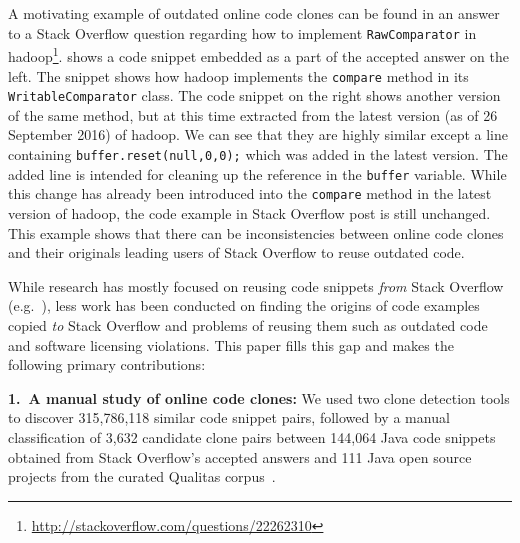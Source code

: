 \documentclass[sigconf,review, anonymous]{acmart}
\begin{document}
A motivating example of outdated online code clones can be found in an
answer to a Stack Overflow question regarding how to implement
{\small{\texttt{RawComparator}}} in
\textsf{hadoop}\footnote{\url{http://stackoverflow.com/questions/22262310}}.
 shows a code snippet embedded as a part of the
accepted answer on the left. The snippet shows how \textsf{hadoop}
implements the {\small{\texttt{compare}}} method in its
{\small{\texttt{WritableComparator}}} class. The code snippet on the
right shows another version of the same method, but at this time
extracted from the latest version (as of 26 September 2016) of
\textsf{hadoop}. We can see that they are highly similar except a line
containing {\small{\verb|buffer.reset(null,0,0);|}} which was added in
the latest version. The added line is intended for cleaning up the
reference in the {\small{\verb|buffer|}} variable. While this change
has already been introduced into the {\small{\texttt{compare}}} method
in the latest version of \textsf{hadoop}, the code example in Stack
Overflow post is still unchanged. This example shows that there can be
inconsistencies between online code clones and their originals leading
users of Stack Overflow to reuse outdated code.

While research has mostly focused on reusing code snippets \emph{from}
Stack Overflow (e.g.~\cite{Keivanloo2014,An2017,Yang2016}), less work
has been conducted on finding the origins of code examples copied
\emph{to} Stack Overflow and problems of reusing them such as outdated
code and software licensing violations. This paper fills this gap and
makes the following primary contributions:

\vspace{0.5ex}%
\noindent\textbf{1.~A manual study of online code clones:} 
We used two clone detection tools to discover 315,786,118 similar code
snippet pairs, followed by a manual classification of 3,632 candidate
clone pairs between 144,064 Java code snippets obtained from Stack Overflow's
accepted answers and 111 Java open source projects from the curated
Qualitas corpus~\cite{QualitasCorpus}.
\end{document}
